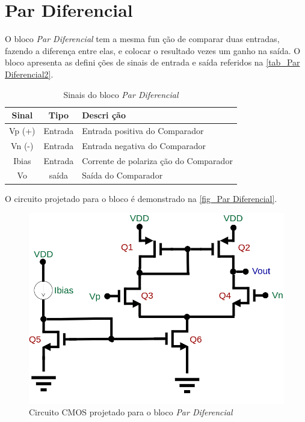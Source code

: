 \renewcommand{\NomeBloco}{\emph{Par Diferencial}}
\renewcommand{\NomeBlocoNoIt}{Par Diferencial}
\renewcommand{\NomePTab}{tab_\NomeBlocoNoIt}
\renewcommand{\NomeSTab}{tab_\NomeBlocoNoIt2}
\renewcommand{\NomePFig}{fig_\NomeBlocoNoIt}
\renewcommand{\NomeSFig}{fig_\NomeBlocoNoIt2}
\renewcommand{\NomeTTab}{tab_\NomeBlocoNoIt3}
\renewcommand{\NomeQTab}{tab_\NomeBlocoNoIt4}

\section{Par Diferencial}

O bloco \NomeBloco{} tem a mesma fun ção de comparar duas entradas, fazendo a diferença entre elas, e colocar o resultado vezes um ganho na saída. O bloco apresenta as defini ções de sinais de entrada e sa\'ida referidos na \autoref{\NomeSTab}.

\begin{table}[htbp]
\caption{Sinais do bloco \NomeBloco}
\label{\NomeSTab}
\centering
\begin{tabular}{ccl}

    \toprule
    Sinal & Tipo    & Descri ção        \\
    \midrule \midrule
    Vp (+) & Entrada & Entrada positiva do Comparador\\
    \midrule
    Vn (-) & Entrada & Entrada negativa do Comparador\\
    \midrule
    Ibias & Entrada & Corrente de polariza ção do Comparador\\
    \midrule
    Vo & sa\'ida & Sa\'ida do Comparador\\
    \bottomrule
\end{tabular}
\end{table}

O circuito projetado para o bloco \'e demonstrado na \autoref{\NomePFig}.

\begin{figure}[htb]
 \label{\NomePFig}
 \centering
    \centering
    \caption{Circuito CMOS projetado para o bloco \NomeBloco} 
    \includegraphics[scale=0.4]{Circuitos/diff_pair.png}
\end{figure}

